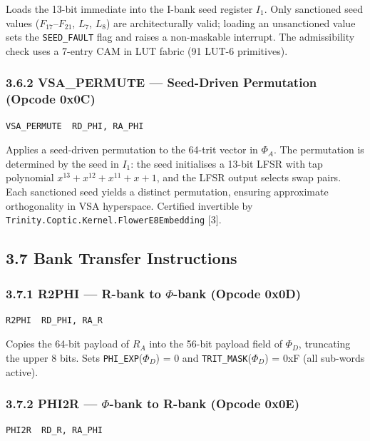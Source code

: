 Loads the 13-bit immediate into the I-bank seed register
\(I_1\). Only sanctioned seed values (\(F_{17}\)--\(F_{21}\),
\(L_7\), \(L_8\)) are architecturally valid; loading an
unsanctioned value sets the \texttt{SEED\_FAULT} flag and
raises a non-maskable interrupt. The admissibility check uses a
7-entry CAM in LUT fabric (91 LUT-6 primitives).

\subsubsection{3.6.2 VSA\_PERMUTE --- Seed-Driven Permutation (Opcode 0x0C)}

\begin{verbatim}
VSA_PERMUTE  RD_PHI, RA_PHI
\end{verbatim}

Applies a seed-driven permutation to the 64-trit vector in
\(\Phi_A\). The permutation is determined by the seed in
\(I_1\): the seed initialises a 13-bit LFSR with tap polynomial
\(x^{13} + x^{12} + x^{11} + x + 1\), and the LFSR output
selects swap pairs. Each sanctioned seed yields a distinct
permutation, ensuring approximate orthogonality in VSA
hyperspace. Certified invertible by
\texttt{Trinity.Coptic.Kernel.FlowerE8Embedding} [3].

\subsection{3.7 Bank Transfer Instructions}\label{fa_71:bank-transfer}

\subsubsection{3.7.1 R2PHI --- R-bank to $\Phi$-bank (Opcode 0x0D)}

\begin{verbatim}
R2PHI  RD_PHI, RA_R
\end{verbatim}

Copies the 64-bit payload of \(R_A\) into the 56-bit payload
field of \(\Phi_D\), truncating the upper 8 bits. Sets
\texttt{PHI\_EXP}(\(\Phi_D\)) = 0 and
\texttt{TRIT\_MASK}(\(\Phi_D\)) = 0xF (all sub-words active).

\subsubsection{3.7.2 PHI2R --- $\Phi$-bank to R-bank (Opcode 0x0E)}

\begin{verbatim}
PHI2R  RD_R, RA_PHI
\end{verbatim}

